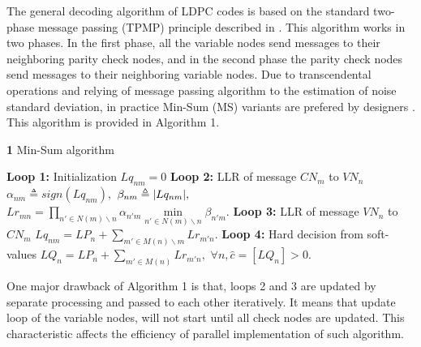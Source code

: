 \documentclass{article}
\DeclarePairedDelimiter\abs{\lvert}{\rvert}%
\begin{document}
The general decoding algorithm of LDPC codes is based on the standard two-phase message passing (TPMP) principle described in \cite{art_massively}. This algorithm works in two phases. In the first phase, all the variable nodes send messages to their neighboring parity check nodes, and in the second phase the parity check nodes send messages to their neighboring variable nodes. Due to transcendental operations and relying of message passing algorithm to the estimation of noise standard deviation, in practice Min-Sum (MS) variants are prefered by designers \cite{art_neon}. This algorithm is provided in Algorithm 1.
\noindent
\begin{algorithm}[H]
\renewcommand\thealgorithm{}
\caption{\textbf{1} Min-Sum algorithm}\label{algorithm1}
\begin{algorithmic}[1]
\STATE \textbf{Loop 1:} Initialization
\STATE
$Lq_{nm}=0$%
\ENDFOR
{}
\STATE \textbf{Loop 2:} LLR of message $CN_m$ to $VN_n$
\STATE $\alpha_{nm} \triangleq sign(Lq_{nm}),$
\STATE $\beta_{nm} \triangleq \abs{Lq_{nm}},$
\STATE $Lr_{mn} = \prod\limits_{n' \in N(m)\backslash n} \alpha_{n'm} \min\limits_{n' \in N(m)\backslash n} \beta_{n'm}.$
\ENDFOR
\STATE \textbf{Loop 3:} LLR of message $VN_n$ to $CN_m$
\STATE $Lq_{nm} = LP_n + \sum\limits_{m' \in M(n)\backslash m} Lr_{m'n}.$
\ENDFOR  
\ENDFOR %
\STATE \textbf{Loop 4:} Hard decision from soft-values
\STATE $LQ_{n} = LP_n + \sum\limits_{m' \in M(n)} Lr_{m'n},$
\STATE $\forall n, \hat{c}=[LQ_n]>0.$
\ENDFOR
\end{algorithmic}
\addtocounter{algorithm}{-1}
\end{algorithm}

One major drawback of Algorithm 1 is that, loops 2 and 3 are updated by separate processing and passed to each other iteratively. It means that update loop of the variable nodes, will not start until all check nodes are updated. This characteristic affects the efficiency of parallel implementation of such algorithm. 
\end{document}
